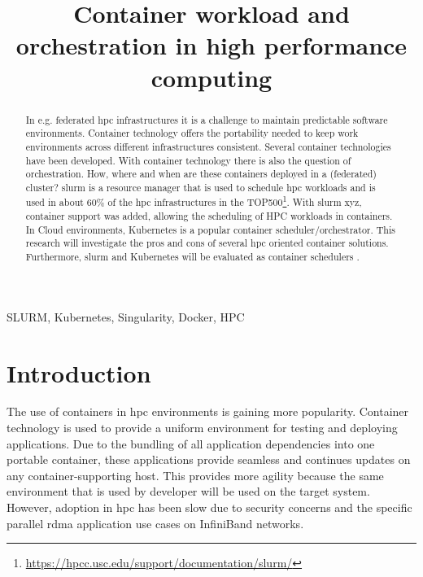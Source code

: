 \documentclass[conference]{IEEEtran}
\begin{document}
\title{Container workload and orchestration in high performance computing}

\author{
}

\maketitle

\begin{abstract}
In e.g. federated \gls{hpc} infrastructures it is a challenge to maintain predictable software environments. Container technology offers the portability needed to keep work environments across different infrastructures consistent. Several container technologies have been developed. With container technology there is also the question of orchestration. How, where and when are these containers deployed in a  (federated) cluster? \gls{slurm} is a resource manager that is used to schedule \gls{hpc} workloads and is used in about 60\% of the \gls{hpc} infrastructures in the TOP500\footnote{\url{https://hpcc.usc.edu/support/documentation/slurm/}}. With \gls{slurm} xyz, container support was added, allowing the scheduling of HPC workloads in containers. In Cloud environments, Kubernetes is a popular container scheduler/orchestrator. This research will investigate the pros and cons of several \gls{hpc} oriented container solutions. Furthermore, \gls{slurm} and Kubernetes will be evaluated as container schedulers \cite{cartesius-userinfo}.
\end{abstract}

\begin{IEEEkeywords}
SLURM, Kubernetes, Singularity, Docker, HPC
\end{IEEEkeywords}


\section{Introduction}
The use of containers in \gls{hpc} environments is gaining more popularity. Container technology is used to provide a uniform environment for testing and deploying applications. Due to the bundling of all application dependencies into one portable container, these applications provide seamless and continues updates on any container-supporting host. This provides more agility because the same environment that is used by developer will be used on the target system. However, adoption in \gls{hpc} has been slow due to security concerns and the specific parallel \gls{rdma} application use cases on InfiniBand networks.
\end{document}
